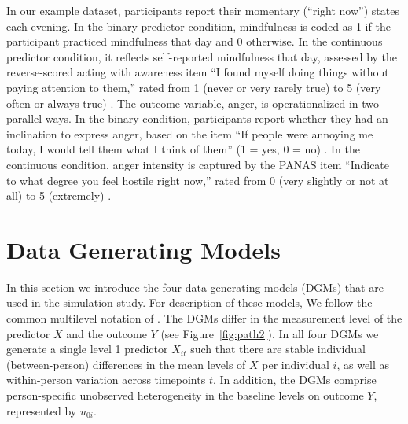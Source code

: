 \documentclass[stu]{apa7}
\begin{document}
In our example dataset, participants report their momentary (``right now'') states each evening. In the binary predictor condition, mindfulness is coded as 1 if the participant practiced mindfulness that day and 0 otherwise. In the continuous predictor condition, it reflects self-reported mindfulness that day, assessed by the reverse-scored acting with awareness item ``I found myself doing things without paying attention to them,'' rated from 1 (never or very rarely true) to 5 (very often or always true) \parencite[]{baer_using_2006}. The outcome variable, anger, is operationalized in two parallel ways. In the binary condition, participants report whether they had an inclination to express anger, based on the item “If people were annoying me today, I would tell them what I think of them” (1 = yes, 0 = no) \parencite[]{buss_aggression_1992}. In the continuous condition, anger intensity is captured by the PANAS item ``Indicate to what degree you feel hostile right now,'' rated from 0 (very slightly or not at all) to 5 (extremely) \parencite[]{watson_panas-x_1994}.

\section{Data Generating Models}

In this section we introduce the four data generating models (DGMs) that are used in the simulation study. For description of these models, We follow the common multilevel notation of \textcite{raudenbush_hierarchical_2002}. The DGMs differ in the measurement level of the predictor $X$ and the outcome $Y$ (see Figure~\ref{fig:path2}). In all four DGMs we generate a single level 1 predictor $X_{it}$ such that there are stable individual (between-person) differences in the mean levels of $X$ per individual $i$, as well as within-person variation across timepoints $t$. In addition, the DGMs comprise person-specific unobserved heterogeneity in the baseline levels on outcome $Y$, represented by $u_{0i}$. 
\end{document}
